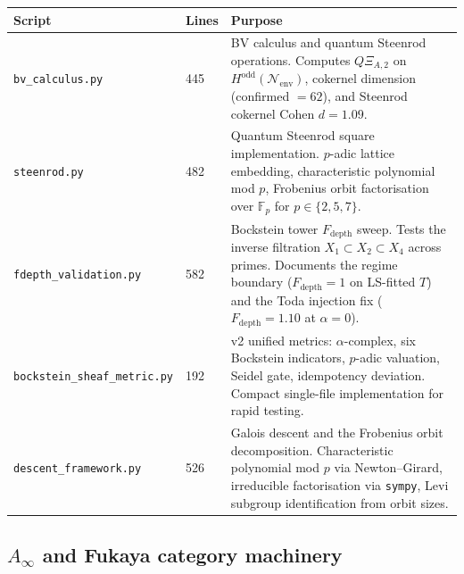 \documentclass[11pt]{amsart}
\theoremstyle{definition}
\begin{document}
\begin{center}
\renewcommand{\arraystretch}{1.2}
\small
\begin{tabular}{@{}p{4.2cm}p{1.0cm}p{8.2cm}@{}}
\toprule
Script & Lines & Purpose \\
\midrule
\texttt{bv\_calculus.py} & 445 &
  BV calculus and quantum Steenrod operations.
  Computes $Q\Xi_{A,2}$ on $H^{\mathrm{odd}}(\mathcal{N}_{\mathrm{env}})$,
  cokernel dimension (confirmed $= 62$), and Steenrod cokernel
  Cohen $d = 1.09$. \\
\texttt{steenrod.py} & 482 &
  Quantum Steenrod square implementation.
  $p$-adic lattice embedding, characteristic polynomial
  mod $p$, Frobenius orbit factorisation over $\mathbb{F}_p$
  for $p \in \{2,5,7\}$. \\
\texttt{fdepth\_validation.py} & 582 &
  Bockstein tower $F_\mathrm{depth}$ sweep.
  Tests the inverse filtration
  $X_1 \subset X_2 \subset X_4$ across primes.
  Documents the regime boundary ($F_\mathrm{depth}=1$ on LS-fitted $T$)
  and the Toda injection fix ($F_\mathrm{depth}=1.10$ at $\alpha=0$). \\
\texttt{bockstein\_sheaf\_metric.py} & 192 &
  v2 unified metrics: $\alpha$-complex, six Bockstein indicators,
  $p$-adic valuation, Seidel gate, idempotency deviation.
  Compact single-file implementation for rapid testing. \\
\texttt{descent\_framework.py} & 526 &
  Galois descent and the Frobenius orbit decomposition.
  Characteristic polynomial mod $p$ via Newton--Girard,
  irreducible factorisation via \texttt{sympy},
  Levi subgroup identification from orbit sizes. \\
\bottomrule
\end{tabular}
\end{center}

\subsection{$A_\infty$ and Fukaya category machinery}
\end{document}
